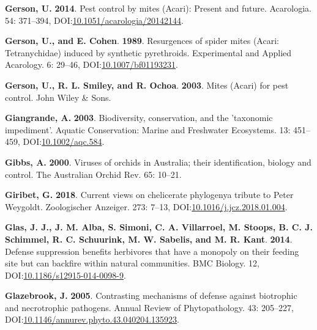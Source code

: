 \documentclass[12pt,final,CPage]{ufthesis}
\newlength{\cslhangindent}
\newenvironment{CSLReferences}[2] %
{%
	\setlength{\parindent}{0pt}
	\ifodd #1 \everypar{\setlength{\hangindent}{\cslhangindent}}\ignorespaces\fi
	\ifnum #2 > 0
	\setlength{\parskip}{#2\baselineskip}
	\fi
}%
{}
\begin{document}
{\begin{CSLReferences}{1}{0}
  \leavevmode{}%
  \textbf{Gerson, U.} \textbf{2014}. Pest control by mites ({Acari}): Present and future. Acarologia. 54: 371--394, DOI:\href{https://doi.org/10.1051/acarologia/20142144}{10.1051/acarologia/20142144}.

  \leavevmode{}%
  \textbf{Gerson, U., and E. Cohen}. \textbf{1989}. Resurgences of spider mites ({Acari}: {Tetranychidae}) induced by synthetic pyrethroids. Experimental and Applied Acarology. 6: 29--46, DOI:\href{https://doi.org/10.1007/bf01193231}{10.1007/bf01193231}.

  \leavevmode{}%
  \textbf{Gerson, U., R. L. Smiley, and R. Ochoa}. \textbf{2003}. Mites ({Acari}) for pest control. John Wiley \& Sons.

  \leavevmode{}%
  \textbf{Giangrande, A.} \textbf{2003}. Biodiversity, conservation, and the 'taxonomic impediment'. Aquatic Conservation: Marine and Freshwater Ecosystems. 13: 451--459, DOI:\href{https://doi.org/10.1002/aqc.584}{10.1002/aqc.584}.

  \leavevmode{}%
  \textbf{Gibbs, A.} \textbf{2000}. Viruses of orchids in {Australia}; their identification, biology and control. The {Australia}n Orchid Rev. 65: 10--21.

  \leavevmode{}%
  \textbf{Giribet, G.} \textbf{2018}. Current views on chelicerate phylogeny{\textemdash}a tribute to {Peter Weygoldt}. Zoologischer Anzeiger. 273: 7--13, DOI:\href{https://doi.org/10.1016/j.jcz.2018.01.004}{10.1016/j.jcz.2018.01.004}.

  \leavevmode{}%
  \textbf{Glas, J. J., J. M. Alba, S. Simoni, C. A. Villarroel, M. Stoops, B. C. J. Schimmel, R. C. Schuurink, M. W. Sabelis, and M. R. Kant}. \textbf{2014}. Defense suppression benefits herbivores that have a monopoly on their feeding site but can backfire within natural communities. {BMC} Biology. 12, DOI:\href{https://doi.org/10.1186/s12915-014-0098-9}{10.1186/s12915-014-0098-9}.

  \leavevmode{}%
  \textbf{Glazebrook, J.} \textbf{2005}. Contrasting mechanisms of defense against biotrophic and necrotrophic pathogens. Annual Review of Phytopathology. 43: 205--227, DOI:\href{https://doi.org/10.1146/annurev.phyto.43.040204.135923}{10.1146/annurev.phyto.43.040204.135923}.


\end{CSLReferences}}
\end{document}
